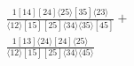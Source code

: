 \documentclass[varwidth, border=5pt]{standalone}
\begin{document}
\begin{my}
$\begin{gathered}
\scriptscriptstyle\frac{1[14][24]⟨25⟩[35]⟨23⟩}{⟨12⟩[15][25]⟨34⟩⟨35⟩[45]}+\\
\scriptscriptstyle\frac{1[13]⟨24⟩[24]⟨25⟩}{⟨12⟩[15][25]⟨34⟩⟨45⟩}\phantom{+}
\end{gathered}$
\end{my}
\end{document}
